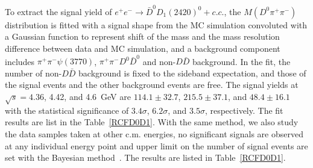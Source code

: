 \documentclass[aps,preprint,superscriptaddress,12pt,tightenlines]{revtex4}
\newcommand{\pp}{\pi^+\pi^-}
\begin{document}
To extract the signal yield of $e^{+}e^{-}\to
\bar{D}^{0}D_{1}(2420)^{0}+c.c.$, the $M(D^0\pp)$ distribution is
fitted with a signal shape from the MC simulation convoluted with
a Gaussian function to represent shift of the mass and the mass
resolution difference between data and MC simulation, and a
background component includes $\pi^{+}\pi^{-}\psi(3770)$,
$\pi^{+}\pi^{-} D^{0}\bar{D}^{0}$ and
non-$D\bar{D}$ background. In the fit, the number of
non-$D\bar{D}$ background is fixed to the sideband expectation,
and those of the signal events and the other background events are
free. The signal yields at $\sqrt{s} = 4.36$, 4.42, and 4.6~GeV
are $114.1\pm 32.7$, $215.5\pm 37.1$, and $48.4\pm 16.1$ with the
statistical significance of $3.4\sigma$, $6.2\sigma$, and
$3.5\sigma$, respectively. The fit results are list in the Table~\ref{RCFD0D1}.  With the same
method, we also study the data samples taken at other c.m.
energies, no significant signals are observed at any individual
energy point and upper limit on the number of signal events are
set with the Bayesian method~\cite{upperlimit}. The results are
listed in Table~\ref{RCFD0D1}.
\end{document}
